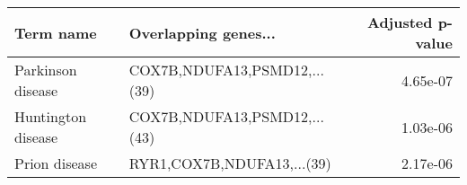 \begin{tabular}{llr}
\toprule
         Term name &         Overlapping genes... &  Adjusted p-value \\
\midrule
 Parkinson disease & COX7B,NDUFA13,PSMD12,...(39) &          4.65e-07 \\
Huntington disease & COX7B,NDUFA13,PSMD12,...(43) &          1.03e-06 \\
     Prion disease &   RYR1,COX7B,NDUFA13,...(39) &          2.17e-06 \\
\bottomrule
\end{tabular}
